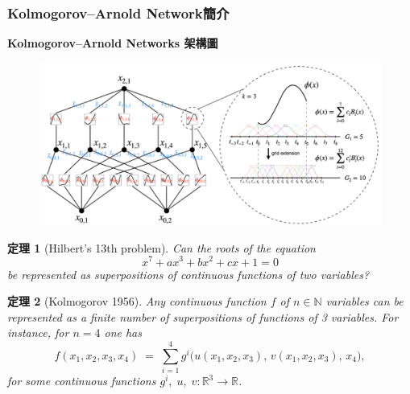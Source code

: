 \documentclass{beamer}
\newtheorem{thm}{定理}
\begin{document}
\begin{frame}
    \frametitle{Kolmogorov–Arnold Network簡介}
    \centering
    \textbf{Kolmogorov–Arnold Networks 架構圖}\\
    \begin{figure}               %
    \centering                 %
    \includegraphics[width=\textwidth,keepaspectratio]{figures/KAN架構.png}
    \end{figure}
\end{frame}

\begin{frame}
\begin{thm} [Hilbert’s 13th problem]
    Can the roots of the equation
    \[
      x^7 + a x^3 + b x^2 + c x + 1 = 0
    \]
    be represented as superpositions of continuous functions of two variables?
 \end{thm}
 \end{frame}

 \begin{frame}
  \begin{thm}[Kolmogorov 1956]
    Any continuous function \(f\) of \(n\in\mathbb{N}\) variables can be represented as a finite number of superpositions of functions of 3 variables. For instance, for \(n=4\) one has
    \[
      f(x_1,x_2,x_3,x_4)
      \;=\;
      \sum_{i=1}^{4}
        g^i\bigl(u(x_1,x_2,x_3),\,v(x_1,x_2,x_3),\,x_4\bigr),
    \]
    for some continuous functions \(g^i,\;u,\;v:\mathbb{R}^3\to\mathbb{R}\).
  \end{thm}
\end{frame}
\end{document}
